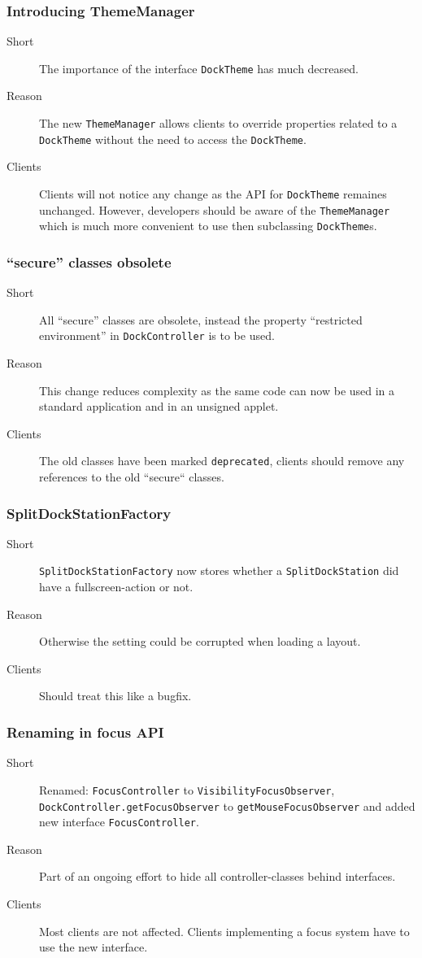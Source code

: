 \documentclass[a4paper,10pt]{article}
\newcommand{\src}[1]{\lstinline[basicstyle=\normalsize\ttfamily,keywordstyle=\normalsize\ttfamily,identifierstyle=\normalsize\ttfamily]|#1|}
\newcommand{\short}{\item[Short]}
\newcommand{\why}{\item[Reason]}
\newcommand{\clients}{\item[Clients]}
\begin{document}
\subsubsection{Introducing ThemeManager}
\begin{description}
 \short The importance of the interface \src{DockTheme} has much decreased.
 \why The new \src{ThemeManager} allows clients to override properties related to a \src{DockTheme} without the need to access the \src{DockTheme}.
 \clients Clients will not notice any change as the API for \src{DockTheme} remaines unchanged. However, developers should be aware of the \src{ThemeManager} which is much more convenient to use then subclassing \src{DockTheme}s.
\end{description}
 
\subsubsection{``secure'' classes obsolete}
\begin{description}
 \short All ``secure'' classes are obsolete, instead the property ``restricted environment'' in \src{DockController} is to be used.
 \why This change reduces complexity as the same code can now be used in a standard application and in an unsigned applet.
 \clients The old classes have been marked \src{deprecated}, clients should remove any references to the old ``secure`` classes.
\end{description}
 
\subsubsection{SplitDockStationFactory}
\begin{description}
 \short \src{SplitDockStationFactory} now stores whether a \src{SplitDockStation} did have a fullscreen-action or not.
 \why Otherwise the setting could be corrupted when loading a layout.
 \clients Should treat this like a bugfix.
\end{description}

\subsubsection{Renaming in focus API}
\begin{description}
 \short Renamed: \src{FocusController} to \src{VisibilityFocusObserver}, \linebreak \src{DockController.getFocusObserver} to \src{getMouseFocusObserver} and \linebreak added new interface \src{FocusController}.
 \why Part of an ongoing effort to hide all controller-classes behind interfaces.
 \clients Most clients are not affected. Clients implementing a focus system have to use the new interface.
\end{description}
\end{document}
